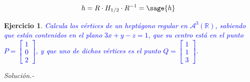 \documentclass{amsart}
\newtheorem{ejer}{Ejercicio}
\begin{document}
\[ h = R\cdot H_{1/2}\cdot R^{-1} = \sage{h}   \]



\newpage

\begin{ejer}
\textcolor{blue}{Calcula los vértices de un heptágono regular en $\mathcal{A}^3(\mathbb{R})$, sabiendo que 
están contenidos en el plano $3x+y-z=1$, que su centro está en el punto $P=\left[\begin{array}{c}1\\0\\2
\end{array}\right]$, y que uno de dichos vértices es el punto $Q=\left[\begin{array}{c}1\\1\\3
\end{array}\right]$.}
\end{ejer}

{\it Solución.-}
\end{document}
